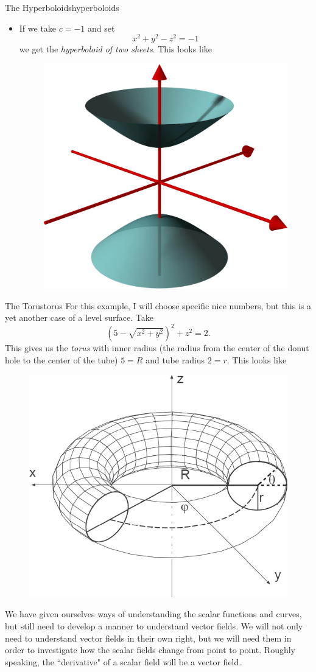 \begin{ex}{The Hyperboloids}{hyperboloids}
\begin{itemize}
            \item If we take $c=-1$ and set
            \[
            x^2+y^2-z^2=-1
            \]
            we get the \emph{hyperboloid of two sheets}.  This looks like
            \begin{figure}[H]
                \centering
                \includegraphics[width=.4\textwidth]{Figures/hyperboloid_2_sheet.png}
            \end{figure}
        \end{itemize}
        \end{ex}
        
        \begin{ex}{The Torus}{torus}
        For this example, I will choose specific nice numbers, but this is a yet another case of a level surface.  Take
        \[
        \left(5-\sqrt{x^2+y^2}\right)^2+z^2=2.
        \]
        This gives us the \emph{torus} with inner radius (the radius from the center of the donut hole to the center of the tube) $5=R$ and tube radius $2=r$. This looks like
        \begin{figure}[H]
            \centering
            \includegraphics[width=.4\textwidth]{Figures/torus.png}
        \end{figure}
        \end{ex}
        
        
        We have given ourselves ways of understanding the scalar functions and curves, but still need to develop a manner to understand vector fields.  We will not only need to understand vector fields in their own right, but we will need them in order to investigate how the scalar fields change from point to point.  Roughly speaking, the ``derivative" of a scalar field will be a vector field.
        
